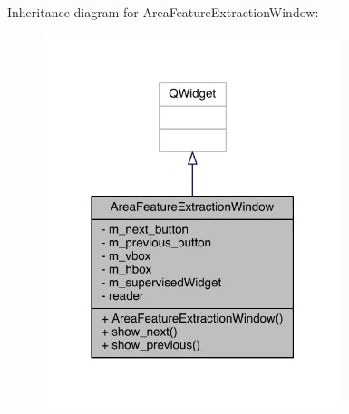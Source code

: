 Inheritance diagram for Area\+Feature\+Extraction\+Window\+:\nopagebreak
\begin{figure}[H]
\begin{center}
\leavevmode
\includegraphics[width=247pt]{class_area_feature_extraction_window__inherit__graph}
\end{center}
\end{figure}


